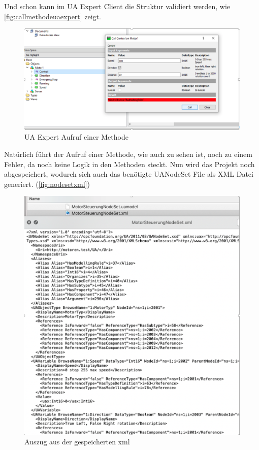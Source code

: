Und schon kann im UA Expert Client die Struktur validiert werden, wie \autoref{fig:callmethodeuaexpert} zeigt.
\begin{figure}[H]
	\centering
	\includegraphics[width=1\linewidth]{abb/CallMethodeUAExpert}
	\caption{UA Expert Aufruf einer Methode}
	\label{fig:callmethodeuaexpert}
\end{figure}
Natürlich führt der Aufruf einer Methode, wie auch zu sehen ist, noch zu einem Fehler, da noch keine Logik in den Methoden steckt.
Nun wird das Projekt noch abgespeichert, wodurch sich auch das benötigte UANodeSet File als XML Datei generiert.
(\autoref{fig:nodesetxml})
\begin{figure}[H]
	\centering
	\includegraphics[width=0.8\linewidth]{abb/NodesetXML}
	\caption{Auszug aus der gespeicherten xml}
	\label{fig:nodesetxml}
\end{figure}

